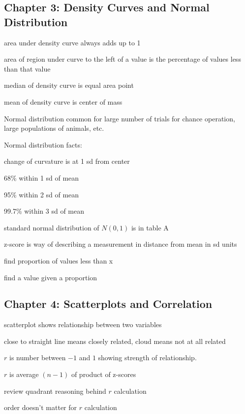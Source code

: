 \documentclass[letterpaper, landscape]{exam}
\begin{document}
  \subsection{Chapter 3: Density Curves and Normal Distribution}
  \begin{itemize*}
    \item area under density curve always adds up to 1
    \item area of region under curve to the left of a value is the percentage of
      values less than that value
    \item median of density curve is equal area point
    \item mean of density curve is center of mass 
    \item Normal distribution common for large number of trials for chance
      operation, large populations of animals, etc.
    \item Normal distribution facts:
      \begin{itemize*}
        \item change of curvature is at 1 sd from center
        \item 68\% within 1 sd of mean
        \item 95\% within 2 sd of mean
        \item 99.7\% within 3 sd of mean
        \item standard normal distribution of $N(0, 1)$ is in table A
      \end{itemize*}

    \item z-score is way of describing a measurement in distance from mean in sd
      units

    \item find proportion of values less than x

    \item find a value given a proportion

  \end{itemize*}

  \subsection{Chapter 4: Scatterplots and Correlation}

  \begin{itemize*}
    \item scatterplot shows relationship between two variables
    \item close to straight line means closely related, cloud means not at all
      related
    \item $r$ is number between $-1$ and $1$ showing strength of relationship.  

    \item $r$ is average $(n - 1)$ of product of z-scores

    \item review quadrant reasoning behind $r$ calculation

    \item order doesn't matter for $r$ calculation
  \end{itemize*}
\end{document}

